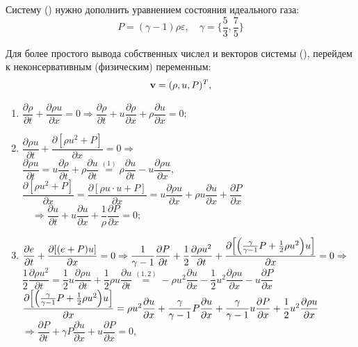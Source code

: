 \documentclass[12pt,a4paper]{article}
\newcommand{\dhalf}{\dfrac{1}{2}}
\newcommand{\dpartial}[2]{\dfrac{ \partial #1 }{ \partial #2 }}
\begin{document}
    Систему () нужно дополнить уравнением состояния идеального газа:
    \begin{equation}
        \label{eq:gas}
        P = (\gamma - 1) \rho \varepsilon, \quad \gamma = \Biggl\{ \dfrac{5}{3}, \dfrac{7}{5} \Biggr\}
    \end{equation}

    Для более простого вывода собственных числел и векторов системы (), перейдем к неконсервативным (физическим) переменным:
    \begin{equation} 
        \label{var1d:phys}
        \bold v = (\rho, u, P)^T,
    \end{equation}

    \begin{enumerate}
        \item $ \dfrac{\partial \rho}{\partial t} + \dfrac{\partial \rho u}{\partial x} = 0 \Rightarrow \dfrac{\partial \rho}{\partial t} + u \dfrac{\partial \rho}{\partial x} + \rho \dpartial{u}{x} = 0;$ \\[0.5em]
        
        \item $ \dpartial{\rho u}{t} + \dpartial{[\rho u^2 + P]}{x} = 0 \Rightarrow $ \\[2mm]
        $ \dpartial{\rho u}{t} = u \dpartial{\rho}{t} + \rho \dpartial{u}{t} \overset{(1)}{=} \rho \dpartial{u}{t} - u \dpartial{\rho u}{x} $, \\[3mm]
        $ \dpartial{[\rho u^2 + P]}{x} = \dpartial{[\rho u \cdot u + P]}{x} = u \dpartial{\rho u}{x} + \rho u \dpartial{u}{x} + \dpartial{P}{x} $ \\[3mm]
        $ \quad \Rightarrow \dpartial{u}{t} + u \dpartial{u}{x} + \dfrac{1}{\rho} \dpartial{P}{x}= 0; $ \\[0.2em]

        \item $ \dpartial{e}{t} + \dpartial{[(e+ P) u]}{x} = 0 \Rightarrow \dfrac{1}{\gamma - 1} \dpartial{P}{t} + \dfrac{1}{2} \dpartial{\rho u^2}{t} + \dpartial{\Bigl[ \Bigl( \tfrac{\gamma}{\gamma - 1} P + \tfrac{1}{2} \rho u^2 \Bigr) u \Bigr]}{x} = 0 \Rightarrow $ \\[2mm]
        $\dfrac{1}{2} \dpartial{\rho u^2}{t} = \dhalf u \dpartial{\rho u}{t} + \dhalf \rho u \dpartial{u}{t} \overset{(1, 2)}{=} - \rho u^2 \dpartial{u}{x} - \dhalf u^2 \dpartial{\rho u}{x} - u \dpartial{P}{x} $ \\[3mm]
        $ \dpartial{\Bigl[ \Bigl( \tfrac{\gamma}{\gamma - 1} P + \tfrac{1}{2} \rho u^2 \Bigr) u \Bigr]}{x} = \rho u^2 \dpartial{u}{x} + \dfrac{\gamma}{\gamma - 1} P \dpartial{u}{x} + \dfrac{\gamma}{\gamma - 1} u \dpartial{P}{x} + \dhalf u^2 \dpartial{\rho u}{x}$ \\[2mm]
        $ \Rightarrow \dpartial{P}{t} + \gamma P \dpartial{u}{x} + u \dpartial{P}{x} = 0, $ \\
      \end{enumerate}  
\end{document}
